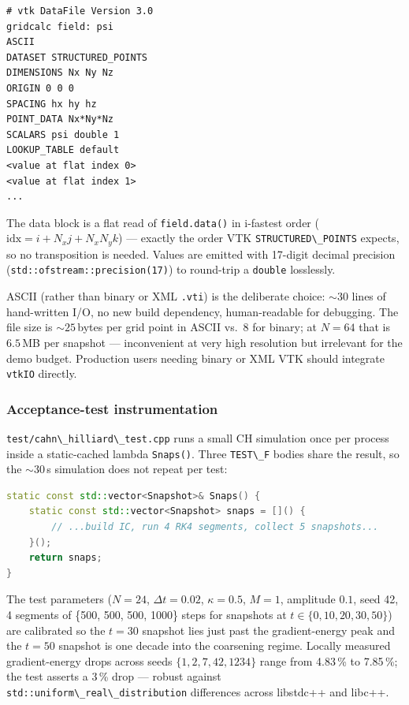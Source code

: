\begin{lstlisting}
# vtk DataFile Version 3.0
gridcalc field: psi
ASCII
DATASET STRUCTURED_POINTS
DIMENSIONS Nx Ny Nz
ORIGIN 0 0 0
SPACING hx hy hz
POINT_DATA Nx*Ny*Nz
SCALARS psi double 1
LOOKUP_TABLE default
<value at flat index 0>
<value at flat index 1>
...
\end{lstlisting}

The data block is a flat read of \passthrough{\lstinline!field.data()!}
in i-fastest order (\(\text{idx} = i + N_x j + N_x N_y k\)) --- exactly
the order VTK \passthrough{\lstinline!STRUCTURED\_POINTS!} expects, so
no transposition is needed. Values are emitted with 17-digit
decimal precision (\passthrough{\lstinline!std::ofstream::precision(17)!})
to round-trip a \passthrough{\lstinline!double!} losslessly.

ASCII (rather than binary or XML \passthrough{\lstinline!.vti!}) is
the deliberate choice: \(\sim 30\) lines of hand-written I/O, no new
build dependency, human-readable for debugging. The file size is
\(\sim 25\,\)bytes per grid point in ASCII vs.\ \(8\) for binary; at
\(N=64\) that is \(6.5\,\)MB per snapshot --- inconvenient at very
high resolution but irrelevant for the demo budget. Production users
needing binary or XML VTK should integrate
\passthrough{\lstinline!vtkIO!} directly.

\subsubsection{Acceptance-test instrumentation}\label{phase12-acc}

\passthrough{\lstinline!test/cahn\_hilliard\_test.cpp!} runs a small
CH simulation once per process inside a static-cached lambda
\passthrough{\lstinline!Snaps()!}. Three \passthrough{\lstinline!TEST\_F!}
bodies share the result, so the \(\sim 30\,\)s simulation does not
repeat per test:

\begin{lstlisting}[language={C++}]
static const std::vector<Snapshot>& Snaps() {
    static const std::vector<Snapshot> snaps = []() {
        // ...build IC, run 4 RK4 segments, collect 5 snapshots...
    }();
    return snaps;
}
\end{lstlisting}

The test parameters
(\(N=24\), \(\Delta t=0.02\), \(\kappa=0.5\), \(M=1\), amplitude
\(0.1\), seed 42, 4 segments of \{500, 500, 500, 1000\} steps for
snapshots at \(t \in \{0,10,20,30,50\}\)) are calibrated so the
\(t=30\) snapshot lies just past the gradient-energy peak and the
\(t=50\) snapshot is one decade into the coarsening regime. Locally
measured gradient-energy drops across seeds \(\{1, 2, 7, 42, 1234\}\)
range from 4.83\,\% to 7.85\,\%; the test asserts a 3\,\% drop ---
robust against \passthrough{\lstinline!std::uniform\_real\_distribution!}
differences across libstdc++ and libc++.

